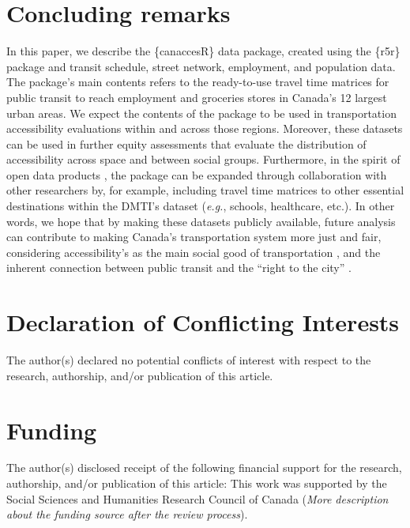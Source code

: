 \documentclass[Royal,times,sageh]{sagej}
\begin{document}
\section{Concluding remarks}\label{concluding-remarks}

In this paper, we describe the \{canaccesR\} data package, created using
the \{r5r\} package and transit schedule, street network, employment,
and population data. The package's main contents refers to the
ready-to-use travel time matrices for public transit to reach employment
and groceries stores in Canada's 12 largest urban areas. We expect the
contents of the package to be used in transportation accessibility
evaluations within and across those regions. Moreover, these datasets
can be used in further equity assessments that evaluate the distribution
of accessibility across space and between social groups. Furthermore, in
the spirit of open data products
\citep{arribas-belOpenDataProductsA2021}, the package can be expanded
through collaboration with other researchers by, for example, including
travel time matrices to other essential destinations within the DMTI's
dataset (\emph{e.g.}, schools, healthcare, etc.). In other words, we
hope that by making these datasets publicly available, future analysis
can contribute to making Canada's transportation system more just and
fair, considering accessibility's as the main social good of
transportation \citep{martensTransportJusticeDesigning2016}, and the
inherent connection between public transit and the ``right to the city''
\citep{cogginRightTransportMoving2015}.

\section{Declaration of Conflicting
Interests}\label{declaration-of-conflicting-interests}

The author(s) declared no potential conflicts of interest with respect
to the research, authorship, and/or publication of this article.

\section{Funding}\label{funding}

The author(s) disclosed receipt of the following financial support for
the research, authorship, and/or publication of this article: This work
was supported by the Social Sciences and Humanities Research Council of
Canada (\emph{More description about the funding source after the review
process}).
\end{document}
